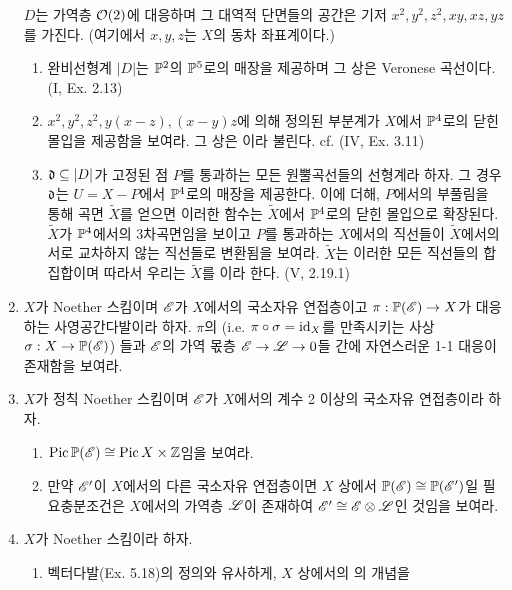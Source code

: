 \begin{enumerate}[label=\tb{7.\arabic*.},itemindent=0mm,itemsep=4mm]
		$D$는 가역층 $\mathcal{O}(2)$에 대응하며 그 대역적 단면들의 공간은 기저 $x^2,y^2,z^2,xy,xz,yz$를 가진다.
		(여기에서 $x,y,z$는 $X$의 동차 좌표계이다.)
		\begin{enumerate}[label=(\alph*)]
			\item 완비선형계 $|D|$는 $\mathbb{P}^2$의 $\mathbb{P}^5$로의 매장을 제공하며 그 상은 Veronese 곡선이다. (I, Ex. 2.13)
			\item $x^2,y^2,z^2,y(x-z),(x-y)z$에 의해 정의된 부분계가 $X$에서 $\mathbb{P}^4$로의 닫힌 몰입을 제공함을 보여라.
			그 상은 이라 불린다. cf. (IV, Ex. 3.11)
			\item $\mathfrak{d}\subseteq|D|$가 고정된 점 $P$를 통과하는 모든 원뿔곡선들의 선형계라 하자.
			그 경우 $\mathfrak{d}$는 $U=X-P$에서 $\mathbb{P}^4$로의 매장을 제공한다.
			이에 더해, $P$에서의 부풀림을 통해 곡면 $\tilde X$를 얻으면 이러한 함수는 $\tilde X$에서 $\mathbb{P}^4$로의 닫힌 몰입으로 확장된다.
			$\tilde X$가 $\mathbb{P}^4$에서의 3차곡면임을 보이고 $P$를 통과하는 $X$에서의 직선들이
			$\tilde X$에서의 서로 교차하지 않는 직선들로 변환됨을 보여라.
			$\tilde X$는 이러한 모든 직선들의 합집합이며 따라서 우리는 $\tilde X$를 이라 한다. (V, 2.19.1)
		\end{enumerate}
		\item $X$가 Noether 스킴이며 $\mathscr{E}$가 $X$에서의 국소자유 연접층이고 $\pi:\mathbb{P}(\mathscr{E})\rightarrow X$가 대응하는 사영공간다발이라 하자.
		$\pi$의 (i.e. $\pi\circ\sigma=\mathrm{id}_X$를 만족시키는 사상 $\sigma:X\rightarrow\mathbb{P}(\mathscr{E})$)%
		들과 $\mathscr{E}$의 가역 몫층 $\mathscr{E}\rightarrow\mathscr{L}\rightarrow 0$들 간에 자연스러운 1-1 대응이 존재함을 보여라.
		\item $X$가 정칙 Noether 스킴이며 $\mathscr{E}$가 $X$에서의 계수 2 이상의 국소자유 연접층이라 하자.
		\begin{enumerate}[label=(\alph*)]
			\item $\operatorname{Pic}\mathbb{P}(\mathscr{E})\cong\operatorname{Pic} X\times\mathbb Z$임을 보여라.
			\item 만약 $\mathscr{E}'$이 $X$에서의 다른 국소자유 연접층이면 $X$ 상에서 $\mathbb{P}(\mathscr{E})\cong\mathbb{P}(\mathscr{E}')$일 필요충분조건은
			$X$에서의 가역층 $\mathscr{L}$이 존재하여 $\mathscr{E}'\cong\mathscr{E}\otimes\mathscr{L}$인 것임을 보여라.
		\end{enumerate}
		\item {} $X$가 Noether 스킴이라 하자.
		\begin{enumerate}[label=(\alph*)]
			\item 벡터다발(Ex. 5.18)의 정의와 유사하게, $X$ 상에서의 의 개념을

\end{enumerate}
\end{enumerate}
